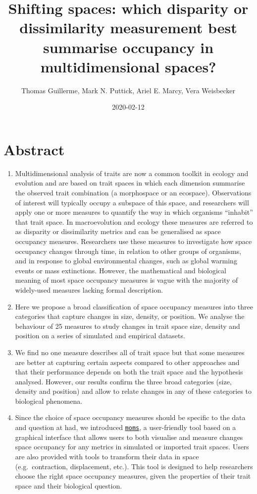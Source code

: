 \documentclass[]{article}
\title{Shifting spaces: which disparity or dissimilarity measurement best
summarise occupancy in multidimensional spaces?}
\author{Thomas Guillerme, Mark N. Puttick, Ariel E. Marcy, Vera Weisbecker}
\date{2020-02-12}
\begin{document}
\modulolinenumbers[1] %
\linenumbers

\maketitle

\linespread{2}

\section{Abstract}\label{abstract}

\begin{enumerate}
\def\labelenumi{\arabic{enumi}.}
\item
  Multidimensional analysis of traits are now a common toolkit in
  ecology and evolution and are based on trait spaces in which each
  dimension summarise the observed trait combination (a morphospace or
  an ecospace). Observations of interest will typically occupy a
  subspace of this space, and researchers will apply one or more
  measures to quantify the way in which organisms ``inhabit'' that trait
  space. In macroevolution and ecology these measures are referred to as
  disparity or dissimilarity metrics and can be generalised as space
  occupancy measures. Researchers use these measures to investigate how
  space occupancy changes through time, in relation to other groups of
  organisms, and in response to global environmental changes, such as
  global warming events or mass extinctions. However, the mathematical
  and biological meaning of most space occupancy measures is vague with
  the majority of widely-used measures lacking formal description.
\item
  Here we propose a broad classification of space occupancy measures
  into three categories that capture changes in size, density, or
  position. We analyse the behaviour of 25 measures to study changes in
  trait space size, density and position on a series of simulated and
  empirical datasets.
\item
  We find no one measure describes all of trait space but that some
  measures are better at capturing certain aspects compared to other
  approaches and that their performance depends on both the trait space
  and the hypothesis analysed. However, our results confirm the three
  broad categories (size, density and position) and allow to relate
  changes in any of these categories to biological phenomena.
\item
  Since the choice of space occupancy measures should be specific to the
  data and question at had, we introduced
  \href{https://tguillerme.shinyapps.io/moms/}{\texttt{moms}}, a
  user-friendly tool based on a graphical interface that allows users to
  both visualise and measure changes space occupancy for any metrics in
  simulated or imported trait spaces. Users are also provided with tools
  to transform their data in space (e.g.~contraction, displacement,
  etc.). This tool is designed to help researchers choose the right
  space occupancy measures, given the properties of their trait space
  and their biological question.
\end{enumerate}
\end{document}
